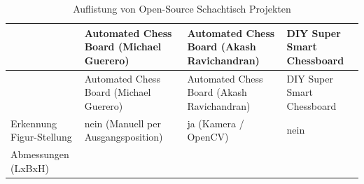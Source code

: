 \begin{longtable}[]{@{}llll@{}}
\caption{Auflistung von Open-Source Schachtisch
Projekten}\tabularnewline
\toprule
\begin{minipage}[b]{0.19\columnwidth}\raggedright
\strut
\end{minipage} & \begin{minipage}[b]{0.25\columnwidth}\raggedright
Automated Chess Board (Michael Guerero) \cite{actproject1}\strut
\end{minipage} & \begin{minipage}[b]{0.26\columnwidth}\raggedright
Automated Chess Board (Akash Ravichandran) \cite{actproject2}\strut
\end{minipage} & \begin{minipage}[b]{0.19\columnwidth}\raggedright
DIY Super Smart Chessboard \cite{actproject3}\strut
\end{minipage}\tabularnewline
\midrule
\endfirsthead
\toprule
\begin{minipage}[b]{0.19\columnwidth}\raggedright
\strut
\end{minipage} & \begin{minipage}[b]{0.25\columnwidth}\raggedright
Automated Chess Board (Michael Guerero) \cite{actproject1}\strut
\end{minipage} & \begin{minipage}[b]{0.26\columnwidth}\raggedright
Automated Chess Board (Akash Ravichandran) \cite{actproject2}\strut
\end{minipage} & \begin{minipage}[b]{0.19\columnwidth}\raggedright
DIY Super Smart Chessboard \cite{actproject3}\strut
\end{minipage}\tabularnewline
\midrule
\endhead
\begin{minipage}[t]{0.19\columnwidth}\raggedright
Erkennung Figur-Stellung\strut
\end{minipage} & \begin{minipage}[t]{0.25\columnwidth}\raggedright
nein (Manuell per Ausgangsposition)\strut
\end{minipage} & \begin{minipage}[t]{0.26\columnwidth}\raggedright
ja (Kamera / OpenCV)\strut
\end{minipage} & \begin{minipage}[t]{0.19\columnwidth}\raggedright
nein\strut
\end{minipage}\tabularnewline
\begin{minipage}[t]{0.19\columnwidth}\raggedright
Abmessungen (LxBxH)\strut

\end{minipage}
\end{longtable}
